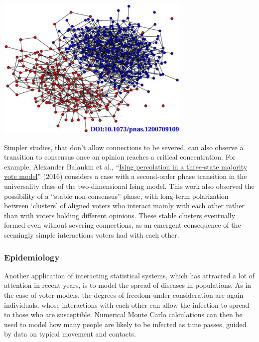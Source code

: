 \begin{center}\includegraphics[width=0.7\textwidth]{figs/unit10_voter.pdf}\end{center}

Simpler studies, that don't allow connections to be severed, can also observe a transition to consensus once an opinion reaches a critical concentration.
For example, Alexander Balankin et al., ``\href{https://doi.org/10.1016/j.physleta.2016.12.001}{Ising percolation in a three-state majority vote model}'' (2016) considers a case with a second-order phase transition in the universality class of the two-dimensional Ising model.
This work also observed the possibility of a ``stable non-consensus'' phase, with long-term polarization between `clusters' of aligned voters who interact mainly with each other rather than with voters holding different opinions.
These stable clusters eventually formed even without severing connections, as an emergent consequence of the seemingly simple interactions voters had with each other.

\subsubsection*{Epidemiology}
Another application of interacting statistical systems, which has attracted a lot of attention in recent years, is to model the spread of diseases in populations.
As in the case of voter models, the degrees of freedom under consideration are again individuals, whose interactions with each other can allow the infection to spread to those who are susceptible.
Numerical Monte Carlo calculations can then be used to model how many people are likely to be infected as time passes, guided by data on typical movement and contacts.

